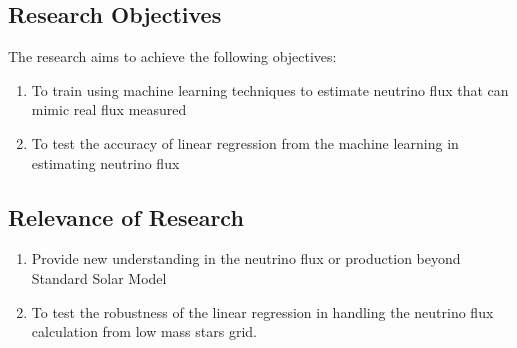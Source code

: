 \subsection{Research Objectives}

The research aims to achieve the following objectives:
\begin{enumerate}
	\item To train using machine learning techniques to estimate neutrino flux that can mimic real flux measured
	\item To test the accuracy of linear regression from the machine learning  in  estimating neutrino flux
	
\end{enumerate}

\subsection{Relevance of Research}

\begin{enumerate}
	\item Provide new understanding in the neutrino flux or production beyond Standard Solar Model
	\item To test the robustness of the linear regression in handling the neutrino flux calculation from low mass stars grid. 
	
\end{enumerate}
